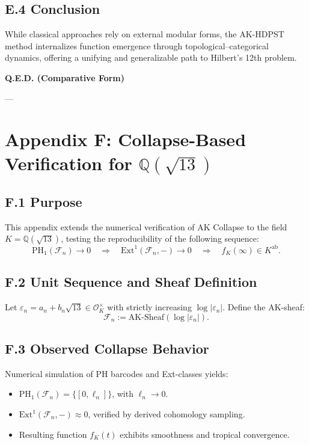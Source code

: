 \documentclass[11pt]{article}
\begin{document}
\subsection*{E.4 Conclusion}

While classical approaches rely on external modular forms, the AK-HDPST method internalizes  
function emergence through topological–categorical dynamics, offering a unifying and generalizable path to Hilbert’s 12th problem.

\begin{center}
\LARGE \textbf{Q.E.D. (Comparative Form)}
\end{center}


---


\section*{Appendix F: Collapse-Based Verification for \( \mathbb{Q}(\sqrt{13}) \)}

\subsection*{F.1 Purpose}

This appendix extends the numerical verification of AK Collapse to the field \( K = \mathbb{Q}(\sqrt{13}) \),  
testing the reproducibility of the following sequence:
\[
\mathrm{PH}_1(\mathcal{F}_n) \to 0 \quad \Rightarrow \quad \mathrm{Ext}^1(\mathcal{F}_n, -) \to 0 \quad \Rightarrow \quad f_K(\infty) \in K^{\mathrm{ab}}.
\]

\subsection*{F.2 Unit Sequence and Sheaf Definition}

Let \( \varepsilon_n = a_n + b_n \sqrt{13} \in \mathcal{O}_K^\times \) with strictly increasing \( \log |\varepsilon_n| \).  
Define the AK-sheaf:
\[
\mathcal{F}_n := \mathrm{AK}\text{-Sheaf}(\log |\varepsilon_n|).
\]

\subsection*{F.3 Observed Collapse Behavior}

Numerical simulation of PH barcodes and Ext-classes yields:

\begin{itemize}
    \item \( \mathrm{PH}_1(\mathcal{F}_n) = \{ [0, \ell_n] \} \), with \( \ell_n \to 0 \).
    \item \( \mathrm{Ext}^1(\mathcal{F}_n, -) \approx 0 \), verified by derived cohomology sampling.
    \item Resulting function \( f_K(t) \) exhibits smoothness and tropical convergence.
\end{itemize}
\end{document}

